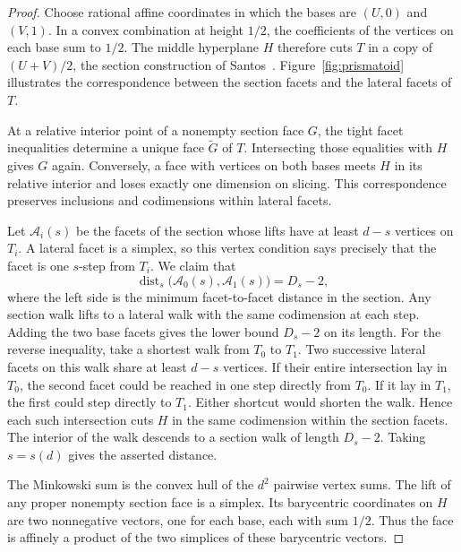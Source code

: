 \begin{proof}
Choose rational affine coordinates in which the bases are $(U,0)$ and
$(V,1)$. In a convex combination at height $1/2$, the coefficients of
the vertices on each base sum to $1/2$. The middle hyperplane $H$
therefore cuts $T$ in a copy of $(U+V)/2$, the section construction of
Santos~\cite[Proposition~5.1]{santos}. Figure~\ref{fig:prismatoid}
illustrates the correspondence between the section facets and the
lateral facets of $T$.



At a relative interior point of a nonempty section face $G$, the tight
facet inequalities determine a unique face $\widetilde G$ of $T$.
Intersecting those equalities with $H$ gives $G$ again. Conversely, a
face with vertices on both bases meets $H$ in its relative interior
and loses exactly one dimension on slicing. This correspondence
preserves inclusions and codimensions within lateral facets.

Let $\mathcal A_i(s)$ be the facets of the section whose lifts have at
least $d-s$ vertices on $T_i$. A lateral facet is a simplex, so this
vertex condition says precisely that the facet is one $s$-step from
$T_i$. We claim that
\[
  \operatorname{dist}_s\bigl(\mathcal A_0(s),\mathcal A_1(s)\bigr)=D_s-2,
\]
where the left side is the minimum facet-to-facet distance in the
section. Any section walk lifts to a lateral walk with the same
codimension at each step. Adding the two base facets gives the lower
bound $D_s-2$ on its length. For the reverse inequality, take a
shortest walk from $T_0$ to $T_1$. Two successive lateral facets on
this walk share at least $d-s$ vertices. If their entire intersection
lay in $T_0$, the second facet could be reached in one step directly
from $T_0$. If it lay in $T_1$, the first could step directly to
$T_1$. Either shortcut would shorten the walk. Hence each such
intersection cuts $H$ in the same codimension within the section
facets. The interior of the walk descends to a section walk of length
$D_s-2$. Taking $s=s(d)$ gives the asserted distance.

The Minkowski sum is the convex hull of the $d^2$ pairwise vertex
sums. The lift of any proper nonempty section face is a simplex.
Its barycentric coordinates on $H$ are two nonnegative vectors, one
for each base, each with sum $1/2$. Thus the face is affinely a
product of the two simplices of these barycentric vectors.
\end{proof}

